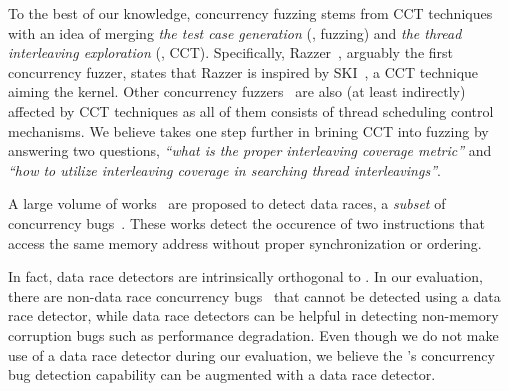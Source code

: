To the best of our knowledge, concurrency fuzzing stems from CCT
techniques with an idea of merging \textit{the test case generation}
(\ie, fuzzing) and \textit{the thread interleaving exploration} (\ie,
CCT).
%
Specifically, Razzer~\cite{razzer}, arguably the first concurrency
fuzzer, states that Razzer is inspired by SKI~\cite{ski}, a CCT
technique aiming the kernel.
%
Other concurrency fuzzers~\cite{krace, muzz, snowboard, conzzer} are
also (at least indirectly) affected by CCT techniques as all of them
consists of thread scheduling control mechanisms.
%
We believe \sys takes one step further in brining CCT into fuzzing by
answering two questions, \textit{``what is the proper interleaving
  coverage metric''} and \textit{``how to utilize interleaving
  coverage in searching thread interleavings''}.



%
A large volume of works~\cite{pacer, datacollider, hybridchecker,
  literace, helgrind, frost, prorace, tsan, kcsan, txrace} are
proposed to detect data races, a \textit{subset} of concurrency
bugs~\cite{lkmm, linuxmemorymodel}.
%
These works detect the occurence of two instructions that access the
same memory address without proper synchronization or ordering.

In fact, data race detectors are intrinsically orthogonal to \sys.
%
In our evaluation, there are non-data race concurrency
bugs~\cite{snowboardbug, cve20196974, cve20177533} that cannot be
detected using a data race detector, while data race detectors can be
helpful in detecting non-memory corruption bugs such as performance
degradation.
%
Even though we do not make use of a data race detector during our
evaluation, we believe the \sys's concurrency bug detection capability
can be augmented with a data race detector.






